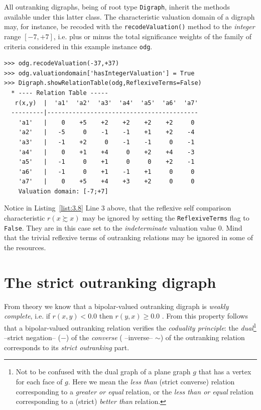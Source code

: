 All outranking digraphs, being of root type {\tt Digraph}, inherit the methods available under this latter class. The characteristic valuation domain of a digraph may, for instance,  be recoded with the {\tt recodeValuation()} method to the {\em integer\/} range $[-7,+7]$, i.e. plus or minus the total significance weights of the family of criteria considered in this example instance \texttt{odg}.
\begin{lstlisting}[caption={Recoding the digraph valuation},label=list:3.8]
>>> odg.recodeValuation(-37,+37)
>>> odg.valuationdomain['hasIntegerValuation'] = True
>>> Digraph.showRelationTable(odg,ReflexiveTerms=False)
  * ---- Relation Table -----
   r(x,y)  |  'a1'  'a2'  'a3'  'a4'  'a5'  'a6'  'a7'	  
  ---------|------------------------------------------
    'a1'   |    0    +5    +2    +2    +2    +2     0	 
    'a2'   |   -5     0    -1    -1    +1    +2    -4	 
    'a3'   |   -1    +2     0    -1    -1     0    -1	 
    'a4'   |    0    +1    +4     0    +2    +4    -3	 
    'a5'   |   -1     0    +1     0     0    +2    -1	 
    'a6'   |   -1     0    +1    -1    +1     0     0	 
    'a7'   |    0    +5    +4    +3    +2     0     0	 
    Valuation domain: [-7;+7]
\end{lstlisting}
Notice in Listing~\ref{list:3.8} Line 3 above, that the reflexive self comparison characteristic $r(x \succsim x)$ may be ignored by setting the \texttt{ReflexiveTerms} flag to \texttt{False}. They are in this case set to the \emph{indeterminate} valuation value $0$. Mind that the trivial reflexive terms of outranking relations may be ignored in some of the \Digraph resources. 

\section{The strict outranking digraph}
\label{sec:3.5}

From theory we know that a bipolar-valued outranking digraph is \emph{weakly complete}, i.e. if $r(x,y) < 0.0$ then $r(y,x) \geq 0.0$ \citep{BIS-2013, ADT-L7}. From this property follows that a bipolar-valued outranking relation verifies the \emph{coduality principle}: the \emph{dual}\footnote{Not to be confused with the dual graph of a plane graph $g$ that has a vertex for each face of $g$. Here we mean the \emph{less than} (strict converse) relation corresponding to a \emph{greater or equal} relation, or the \emph{less than or equal} relation corresponding to a (strict) \emph{better than} relation.} --strict negation-- ($-$) of the \emph{converse} ( --inverse-- $\sim$) of the outranking relation corresponds to its {\em strict outranking\/} part.

